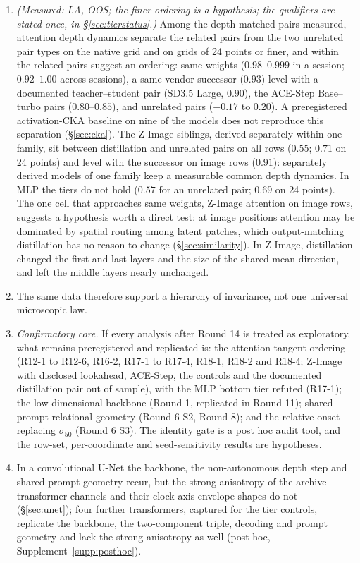\documentclass[11pt]{article}
\begin{document}
\begin{enumerate}
 \item \emph{(Measured: LA, OOS; the finer ordering is a hypothesis; the qualifiers are stated once, in \S\ref{sec:tierstatus}.)} Among the depth-matched pairs measured, attention depth dynamics separate the related pairs from the two unrelated pair types on the native grid and on grids of 24 points or finer, and within the related pairs suggest an ordering: same weights ($0.98$--$0.999$ in a session; $0.92$--$1.00$ across sessions), a same-vendor successor ($0.93$) level with a documented teacher--student pair (SD3.5 Large, $0.90$), the ACE-Step Base--turbo pairs ($0.80$--$0.85$), and unrelated pairs ($-0.17$ to $0.20$). A preregistered activation-CKA baseline on nine of the models does not reproduce this separation (\S\ref{sec:cka}). The Z-Image siblings, derived separately within one family, sit between distillation and unrelated pairs on all rows ($0.55$; $0.71$ on 24 points) and level with the successor on image rows ($0.91$): separately derived models of one family keep a measurable common depth dynamics. In MLP the tiers do not hold ($0.57$ for an unrelated pair; $0.69$ on 24 points). The one cell that approaches same weights, Z-Image attention on image rows, suggests a hypothesis worth a direct test: at image positions attention may be dominated by spatial routing among latent patches, which output-matching distillation has no reason to change (\S\ref{sec:similarity}). In Z-Image, distillation changed the first and last layers and the size of the shared mean direction, and left the middle layers nearly unchanged.
 \item The same data therefore support a hierarchy of invariance, not one universal microscopic law.
 \item \emph{Confirmatory core.} If every analysis after Round 14 is treated as exploratory, what remains preregistered and replicated is: the attention tangent ordering (R12-1 to R12-6, R16-2, R17-1 to R17-4, R18-1, R18-2 and R18-4; Z-Image with disclosed lookahead, ACE-Step, the controls and the documented distillation pair out of sample), with the MLP bottom tier refuted (R17-1); the low-dimensional backbone (Round 1, replicated in Round 11); shared prompt-relational geometry (Round 6 S2, Round 8); and the relative onset replacing $\sigma_{50}$ (Round 6 S3). The identity gate is a post hoc audit tool, and the row-set, per-coordinate and seed-sensitivity results are hypotheses.
 \item In a convolutional U-Net the backbone, the non-autonomous depth step and shared prompt geometry recur, but the strong anisotropy of the archive transformer channels and their clock-axis envelope shapes do not (\S\ref{sec:unet}); four further transformers, captured for the tier controls, replicate the backbone, the two-component triple, decoding and prompt geometry and lack the strong anisotropy as well (post hoc, Supplement~\ref{supp:posthoc}).

\end{enumerate}
\end{document}
